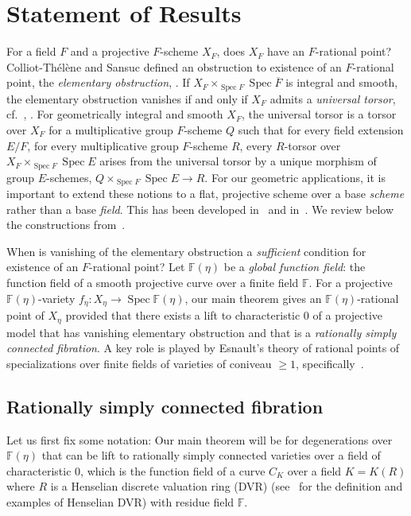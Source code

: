 \documentclass[11pt]{article}
\theoremstyle{definition}
\numberwithin{equation}{section}
\numberwithin{figure}{section}
\numberwithin{table}{section}
\newcommand{\mbb}{\mathbb}
\newcommand{\FF}{\mbb{F}}
\newcommand{\ol}{\overline}
\newcommand{\Xx}{X}
\newcommand{\Rr}{R}
\DeclareMathOperator{\SP}{Spec}
\begin{document}
\section{Statement of Results}\label{sec-state}

For a field $F$ and a projective $F$-scheme $\Xx_F$, does $\Xx_F$ have an $F$-rational point? Colliot-Thélène and Sansuc defined an obstruction to existence of an $F$-rational point, the
\emph{elementary obstruction}, \cite[Section~2.2]{CTSansuc}. If $\Xx_F\times_{\SP F} \SP \ol{F}$ is integral and smooth, the elementary obstruction vanishes if and only if $\Xx_F$ admits a \emph{universal torsor}, cf.~\cite[Proposition~2.2.3]{CTSansuc}, \cite[Theorem~2.3.4]{Sk}. For geometrically integral and smooth $\Xx_F$, the universal torsor is a torsor over $\Xx_F$ for a multiplicative group $F$-scheme $Q$ such that for every field extension $E/F$, for every multiplicative group $F$-scheme $R$, every $R$-torsor over $\Xx_F\times_{\SP F} \SP E$ arises from the universal torsor by a unique morphism of group $E$-schemes, $Q\times_{\SP F} \SP E \to R$. For our geometric applications, it is important to extend these notions to a flat, projective scheme over a base \emph{scheme} rather than a base \emph{field}. This has been developed in~\cite[Definition, p.~468]{Pirutka} and in~\cite{Zhu}. We review below the constructions from~\cite{Zhu}.

When is vanishing of the elementary obstruction a \emph{sufficient} condition for existence of an $F$-rational point? Let $\FF(\eta)$ be a \emph{global function field}: the function field of a smooth projective curve over a finite field $\FF$. For a projective $\FF(\eta)$-variety $f_\eta:\Xx_\eta \to \SP \FF(\eta)$, our main theorem gives an $\FF(\eta)$-rational point of $\Xx_\eta$ provided that there exists a lift to characteristic $0$ of a projective model that has vanishing elementary obstruction and that is a \emph{rationally simply connected fibration}. A key role is played by Esnault's theory of rational points of specializations over finite fields of varieties of coniveau $\geq 1$, specifically~\cite[Corollary~1.2]{Esnaultpadic}.


\subsection{Rationally simply connected fibration}

Let us first fix some notation: Our main theorem will be for degenerations over $\mathbb{F}(\eta)$ that can be lift to rationally simply connected varieties over a field of characteristic 0, which is the function field of a curve $C_K$ over a field $K=K(\Rr)$ where $\Rr$ is a Henselian discrete valuation ring (DVR) (see~\cite{Greenberg84} for the definition and examples of Henselian DVR) with residue field $\FF$.
\end{document}
